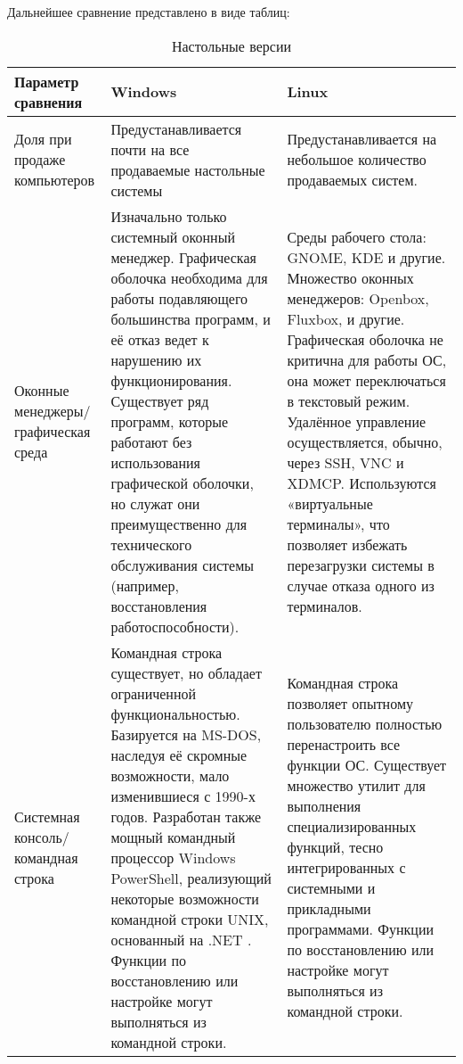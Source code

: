 \documentclass[14pt]{article}
\begin{document}
    Дальнейшее сравнение представлено в виде таблиц:
    \begin{table}[H]
        \caption{Настольные версии}
        \begin{tabularx}{\textwidth}{|X|X|X|}
            \hline
            Параметр сравнения & Windows & Linux \\
            \hline
            Доля при продаже компьютеров & Предустанавливается почти на все продаваемые настольные системы & Предустанавливается на небольшое количество продаваемых систем. \\
            \hline
            Оконные менеджеры/графическая среда & Изначально только системный оконный менеджер. Графическая оболочка необходима для работы подавляющего большинства программ, и её отказ ведет к нарушению их функционирования. Существует ряд программ, которые работают без использования графической оболочки, но служат они преимущественно для технического обслуживания системы (например, восстановления работоспособности). & Среды рабочего стола: GNOME, KDE и другие. Множество оконных менеджеров: Openbox, Fluxbox, и другие. Графическая оболочка не критична для работы ОС, она может переключаться в текстовый режим. Удалённое управление осуществляется, обычно, через SSH, VNC и XDMCP. Используются «виртуальные терминалы», что позволяет избежать перезагрузки системы в случае отказа одного из терминалов. \\
            \hline
            Системная консоль/командная строка & Командная строка существует, но обладает ограниченной функциональностью. Базируется на MS-DOS, наследуя её скромные возможности, мало изменившиеся с 1990-х годов. Разработан также мощный командный процессор Windows PowerShell, реализующий некоторые возможности командной строки UNIX, основанный на .NET . Функции по восстановлению или настройке могут выполняться из командной строки. & Командная строка позволяет опытному пользователю полностью перенастроить все функции ОС. Существует множество утилит для выполнения специализированных функций, тесно интегрированных с системными и прикладными программами. Функции по восстановлению или настройке могут выполняться из командной строки. \\
            \hline
        \end{tabularx}
    \end{table}

    \newpage
\end{document}
